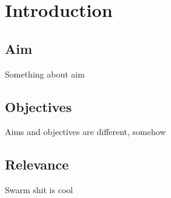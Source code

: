 \chapter{Introduction}
\label{chap:Introduction}

\section{Aim}
Something about aim


\section{Objectives}
Aims and objectives are different, somehow

\section{Relevance}
Swarm shit is cool \citep{Moeslinger2010}